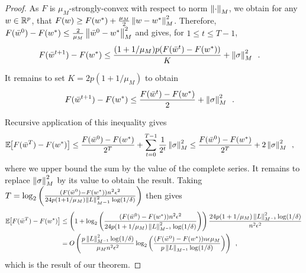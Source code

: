 \begin{proof}
  As $F$ is $\mu_M$-strongly-convex with respect to norm $\left \lVert \cdot \right \rVert_M$,
  we obtain for any $w \in \mathbb R^p$, that $F(w) \ge F(w^*) + \frac{\mu_M}{2} \left \lVert w - w^* \right \rVert_M^2$.
  Therefore, $F(\bar w^0) - F(w^*) \le \frac{2}{\mu_M} \left \lVert \bar w^0 - w^* \right \rVert_M^2$
  and  gives, for $1 \le t \le T-1$,
  \begin{align}
    F(\bar w^{t+1}) - F(w^*)
     & \le \frac{(1+1/\mu_M) p(F(\bar w^t) - F(w^*))}{K}
    + \left \lVert \sigma \right \rVert_M^2\enspace.
  \end{align}

  It remains to set $K = 2 p (1 + 1/\mu_M)$ to obtain
  \begin{align}
    F(\bar w^{t+1}) - F(w^*)
     & \le \frac{F(\bar w^t) - F(w^*)}{2}
    + \left \lVert \sigma \right \rVert_M^2\enspace.
  \end{align}

  Recursive application of this inequality gives
  \begin{align}
    \label{lemma:dp-cd-strong-convexity-convergence:eq:conv}
    \mathbb E_{} \hspace{-0.29em} \left[ F(\bar w^T) - F(w^*) \right]
     & \le \frac{F(\bar w^0) - F(w^*)}{2^T} + \sum_{t=0}^{T-1} \frac{1}{2^t} \left \lVert \sigma \right \rVert_M^2
    \le \frac{F(\bar w^0) - F(w^*)}{2^T} + 2 \left \lVert \sigma \right \rVert_M^2\enspace,
  \end{align}
  where we upper bound the sum by the value of the complete series.
  It remains to replace $\left \lVert \sigma \right \rVert_M^2$ by its value to obtain the result.
  Taking
  $T = \log_2\left(\frac{(F(\bar w^0) - F(w^*)) n^2 \epsilon^2}{24 p (1+1/\mu_M)\left \lVert L \right \rVert_{M^{-1}}^2 \log(1/\delta)}\right)$
  then gives
  \begin{align}
    \mathbb E_{} \hspace{-0.29em} \left[ F(\bar w^T) - F(w^*) \right]
     & \le \left(1 + \log_2\left(\frac{(F(\bar w^0) - F(w^*)) n^2 \epsilon^2}{24 p (1+1/\mu_M)\left \lVert L \right \rVert_{M^{-1}}^2 \log(1/\delta)}\right)\right)
    \frac{24 p (1+1/\mu_M)\left \lVert L \right \rVert_{M^{-1}}^2 \log(1/\delta)}{n^2 \epsilon^2}                                                                   \\
     & = O\left(
    \frac{p\left \lVert L \right \rVert_{M^{-1}}^2 \log(1/\delta)}{\mu_M n^2 \epsilon^2}
    \log_2\left(\frac{(F(\bar w^0) - F(w^*)) n \epsilon \mu_M}{p\left \lVert L \right \rVert_{M^{-1}}\log(1/\delta)}\right)
    \right)\enspace,
  \end{align}
  which is the result of our theorem.
\end{proof}


